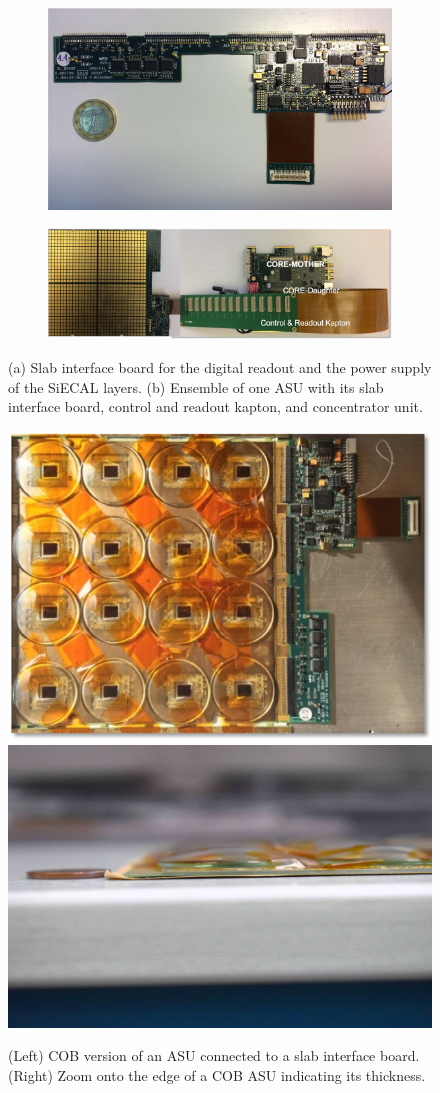 \begin{figure}[t!]
\centering
\begin{subfigure}{0.48\textwidth}
\includegraphics[width=1\hsize]{Detector/fig/siwecal-slboard.jpg}
\caption{}
\end{subfigure}
\begin{subfigure}{0.48\textwidth}
\includegraphics[width=1\hsize]{Detector/fig/siwecal-fevslcore.jpg}
\caption{}
\end{subfigure}
\caption{(a) Slab interface board for the digital readout and the power supply of the SiECAL layers. (b) Ensemble of one ASU with its slab interface board, control and readout kapton, and concentrator unit.}
\label{fig:det:SiWECAL_slcards}
\end{figure}


\begin{figure}[t!]
\centering
\includegraphics[width=0.35\hsize]{Detector/fig/siwecal-cob-sl.png}
\includegraphics[width=0.38\hsize]{Detector/fig/siwecal-cob-side-red.jpg}
\caption{(Left) COB version of an ASU connected to a slab interface board. (Right) Zoom onto the edge of a COB ASU indicating its thickness.}
\label{fig:det:SiWECAL_cob}
\end{figure}



